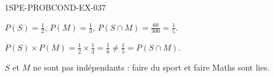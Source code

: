 \begin{corrige}{1SPE-PROBCOND-EX-037}

$P(S) = \frac{1}{2}$, $P(M) = \frac{1}{3}$, $P(S \cap M) = \frac{60}{300} = \frac{1}{5}$.

$P(S) \times P(M) = \frac{1}{2} \times \frac{1}{3} = \frac{1}{6}
\neq \frac{1}{5} = P(S \cap M)$.

$S$ et $M$ ne sont pas indépendants : faire du sport et faire Maths sont lies.

\end{corrige}
